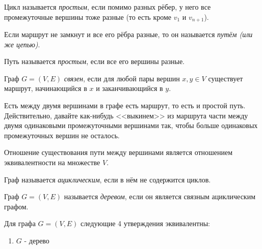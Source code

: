 \begin{multicols}{2}
    \begin{definition}{}{}
      Цикл называется \textit{простым}, если помимо разных рёбер, у него все промежуточные вершины тоже разные (то есть кроме $v_1$ и $v_{n + 1}$).
    \end{definition}
    
    \begin{definition}{}{}
      Если маршрут не замкнут и все его рёбра разные, то он называется \textit{путём (или же цепью)}.
    \end{definition}
    
    \begin{definition}{}{}
      Путь называется \textit{простым}, если все его вершины разные.
    \end{definition}
    
    \begin{definition}{}{}
      Граф $G = (V, E)$ \textit{связен}, если для любой пары вершин $x, y \in V$ существует маршрут, начинающийся в $x$ и заканчивающийся в $y$.
    \end{definition}
    
    \begin{note}{}{}
      Есть между двумя вершинами в графе есть маршрут, то есть и простой путь. Действительно, давайте как-нибудь <<выкинем>> из маршрута части между двумя одинаковыми промежуточными вершинами так, чтобы больше одинаковых промежуточных вершин не осталось.
    \end{note}
    
    \begin{note}{}{}
      Отношение существования пути между вершинами является отношением эквивалентности на множестве $V$.
    \end{note}
    
    \begin{definition}{}{}
      Граф называется \textit{ациклическим}, если в нём не содержится циклов.
    \end{definition}
    
    \begin{definition}{}{}
      Граф $G = (V, E)$ называется \textit{деревом}, если он является связным ациклическим графом.
    \end{definition}
    
    \begin{theorema}{}{}
      Для графа $G = (V, E)$ следующие 4 утверждения эквивалентны:
      \begin{enumerate}
        \item $G$ - дерево
        

\end{enumerate}
\end{theorema}
\end{multicols}
